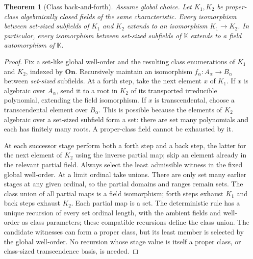 \documentclass[11pt]{article}
\newtheorem{theorem}{Theorem}[section]
\theoremstyle{definition}
\theoremstyle{remark}
\newcommand{\On}{\mathbf{On}}
\newcommand{\K}{\mathbb K}
\numberwithin{equation}{section}
\begin{document}
\begin{theorem}[Class back-and-forth]\label{saut:thm:acfhomogeneity}
Assume global choice. Let $K_1,K_2$ be proper-class algebraically closed
fields of the same characteristic. Every isomorphism between set-sized
subfields of $K_1$ and $K_2$ extends to an isomorphism $K_1\to K_2$.
In particular, every isomorphism between set-sized subfields of $\K$
extends to a field automorphism of $\K$.
\end{theorem}
\begin{proof}
Fix a set-like global well-order and the resulting class enumerations of
$K_1$ and $K_2$, indexed by $\On$.
Recursively maintain an isomorphism $f_\alpha:A_\alpha\to B_\alpha$
between \emph{set-sized} subfields. At a forth step, take the next element
$x$ of $K_1$. If $x$ is algebraic over $A_\alpha$, send it to a root in
$K_2$ of its transported irreducible polynomial, extending the field
isomorphism. If $x$ is transcendental, choose a transcendental element over
$B_\alpha$. This is possible because the elements of $K_2$ algebraic over
a set-sized subfield form a set: there are set many polynomials and each
has finitely many roots. A proper-class field cannot be exhausted by it.

At each successor stage perform both a forth step and a back step, the
latter for the next element of $K_2$ using the inverse partial map; skip an
element already in the relevant partial field. Always select the least
admissible witness in the fixed global well-order. At a limit ordinal
take unions. There are only set many
earlier stages at any given ordinal, so the partial domains and ranges
remain sets. The class union of all partial maps is a field isomorphism;
forth steps exhaust $K_1$ and back steps exhaust $K_2$.
Each partial map is a set. The deterministic rule has a unique recursion
of every set ordinal length, with the ambient fields and well-order as
class parameters; these compatible recursions define the class union.
The candidate witnesses can form a proper class, but its least member is
selected by the global well-order. No recursion whose stage value is itself
a proper class, or class-sized transcendence basis, is needed.
\end{proof}
\end{document}
